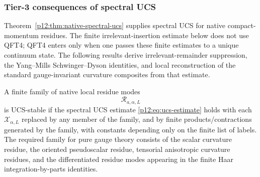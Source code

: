 \documentclass[12pt,a4paper]{article}
\begin{document}
\subsubsection{Tier-3 consequences of spectral UCS}
\label{p12:subsec:tier3-ucs-consequences}

Theorem~\ref{p12:thm:native-spectral-ucs} supplies spectral UCS for native compact-momentum residues.  The finite irrelevant-insertion estimate below does not use QFT4; QFT4 enters only when one passes these finite estimates to a unique continuum state.  The following results derive irrelevant-remainder suppression, the Yang--Mills Schwinger--Dyson identities, and local reconstruction of the standard gauge-invariant curvature composites from that estimate.

\begin{definition}
\label{p12:def:ucs-stable-curvature-residue-family}
A finite family of native local residue modes
\[
\mathcal R_{a,\alpha,L}
\]
is UCS-stable if the spectral UCS estimate \eqref{p12:eq:ucs-estimate} holds with each \(\mathcal X_{\alpha,L}\) replaced by any member of the family, and by finite products/contractions generated by the family, with constants depending only on the finite list of labels.  The required family for pure gauge theory consists of the scalar curvature residue, the oriented pseudoscalar residue, tensorial anisotropic curvature residues, and the differentiated residue modes appearing in the finite Haar integration-by-parts identities.
\end{definition}
\end{document}
